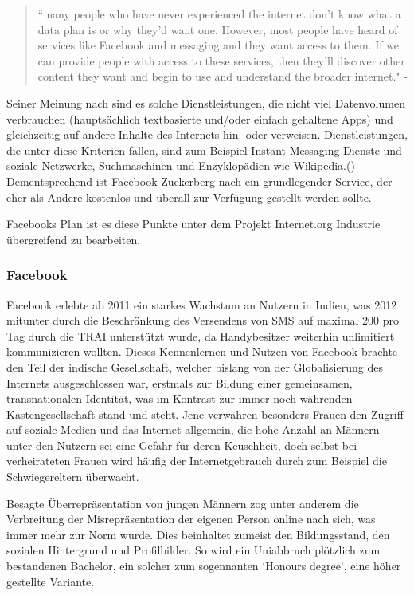 \documentclass{article}
\begin{document}
\begin{quote}
``many people who have never experienced the internet don’t know what a data plan is or why they’d want one. 
However, most people have heard of services like Facebook and messaging and they want access to them. If we can provide people 
with access to these services, then they’ll discover other content they want and begin to use 
and understand the broader internet." - \textcite[4]{HumanRight}
\end{quote}

Seiner Meinung nach sind es solche Dienstleistungen, die nicht viel Datenvolumen verbrauchen (hauptsächlich textbasierte und/oder einfach gehaltene Apps) und gleichzeitig auf andere Inhalte des Internets hin- oder verweisen.
Dienstleistungen, die unter diese Kriterien fallen, sind zum Beispiel Instant-Messaging-Dienste und soziale Netzwerke, Suchmaschinen und Enzyklopädien wie Wikipedia.(\cite[5]{HumanRight})
Dementsprechend ist Facebook Zuckerberg nach ein grundlegender Service, der eher als Andere kostenlos und überall zur Verfügung gestellt werden sollte.

\medskip

Facebooks Plan ist es diese Punkte unter dem Projekt Internet.org Industrie übergreifend zu bearbeiten.

\subsubsection{Facebook}

Facebook erlebte ab 2011 ein starkes Wachstum an Nutzern in Indien, was 2012 mitunter durch die Beschränkung des Versendens von SMS auf maximal 200 pro Tag durch die TRAI unterstützt wurde, da Handybesitzer weiterhin unlimitiert kommunizieren wollten.
Dieses Kennenlernen und Nutzen von Facebook brachte den Teil der indische Gesellschaft, welcher bislang von der Globalisierung des Internets ausgeschlossen war, erstmals zur Bildung einer gemeinsamen, transnationalen Identität, was im Kontrast zur immer noch währenden Kastengesellschaft stand und steht.
Jene verwähren besonders Frauen den Zugriff auf soziale Medien und das Internet allgemein, die hohe Anzahl an Männern unter den Nutzern sei eine Gefahr für deren Keuschheit, doch selbst bei verheirateten Frauen wird häufig der Internetgebrauch durch zum Beispiel die Schwiegereltern überwacht.

\medskip

Besagte Überrepräsentation von jungen Männern zog unter anderem die Verbreitung der Misrepräsentation der eigenen Person online nach sich, was immer mehr zur Norm wurde.
Dies beinhaltet zumeist den Bildungsstand, den sozialen Hintergrund und Profilbilder. So wird ein Uniabbruch plötzlich zum bestandenen Bachelor, ein solcher zum sogennanten `Honours degree', eine höher gestellte Variante.
\end{document}
